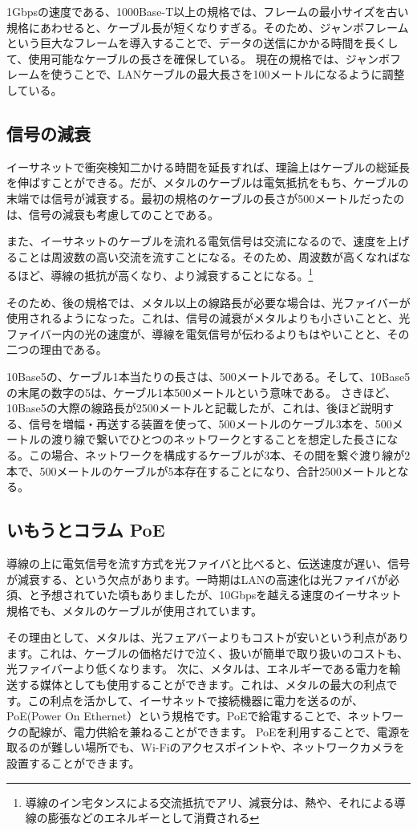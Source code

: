 1Gbpsの速度である、1000Base-T以上の規格では、フレームの最小サイズを古い規格にあわせると、ケーブル長が短くなりすぎる。そのため、ジャンボフレームという巨大なフレームを導入することで、データの送信にかかる時間を長くして、使用可能なケーブルの長さを確保している。
現在の規格では、ジャンボフレームを使うことで、LANケーブルの最大長さを100メートルになるように調整している。

\subsection{信号の減衰}
イーサネットで衝突検知二かける時間を延長すれば、理論上はケーブルの総延長を伸ばすことができる。だが、メタルのケーブルは電気抵抗をもち、ケーブルの末端では信号が減衰する。最初の規格のケーブルの長さが500メートルだったのは、信号の減衰も考慮してのことである。

また、イーサネットのケーブルを流れる電気信号は交流になるので、速度を上げることは周波数の高い交流を流すことになる。そのため、周波数が高くなればなるほど、導線の抵抗が高くなり、より減衰することになる。\footnote{導線のイン宅タンスによる交流抵抗でアリ、減衰分は、熱や、それによる導線の膨張などのエネルギーとして消費される}

そのため、後の規格では、メタル以上の線路長が必要な場合は、光ファイバーが使用されるようになった。これは、信号の減衰がメタルよりも小さいことと、光ファイバー内の光の速度が、導線を電気信号が伝わるよりもはやいことと、その二つの理由である。

10Base5の、ケーブル1本当たりの長さは、500メートルである。そして、10Base5の末尾の数字の5は、ケーブル1本500メートルという意味である。
さきほど、10Base5の大際の線路長が2500メートルと記載したが、これは、後ほど説明する、信号を増幅・再送する装置を使って、500メートルのケーブル3本を、500メートルの渡り線で繋いでひとつのネットワークとすることを想定した長さになる。この場合、ネットワークを構成するケーブルが3本、その間を繋ぐ渡り線が2本で、500メートルのケーブルが5本存在することになり、合計2500メートルとなる。

\subsection*{いもうとコラム PoE}
導線の上に電気信号を流す方式を光ファイバと比べると、伝送速度が遅い、信号が減衰する、という欠点があります。一時期はLANの高速化は光ファイバが必須、と予想されていた頃もありましたが、10Gbpsを越える速度のイーサネット規格でも、メタルのケーブルが使用されています。

その理由として、メタルは、光フェアバーよりもコストが安いという利点があります。これは、ケーブルの価格だけで泣く、扱いが簡単で取り扱いのコストも、光ファイバーより低くなります。
次に、メタルは、エネルギーである電力を輸送する媒体としても使用することができます。これは、メタルの最大の利点です。この利点を活かして、イーサネットで接続機器に電力を送るのが、PoE(Power On Ethernet）という規格です。PoEで給電することで、ネットワークの配線が、電力供給を兼ねることができます。
PoEを利用することで、電源を取るのが難しい場所でも、Wi-Fiのアクセスポイントや、ネットワークカメラを設置することができます。



